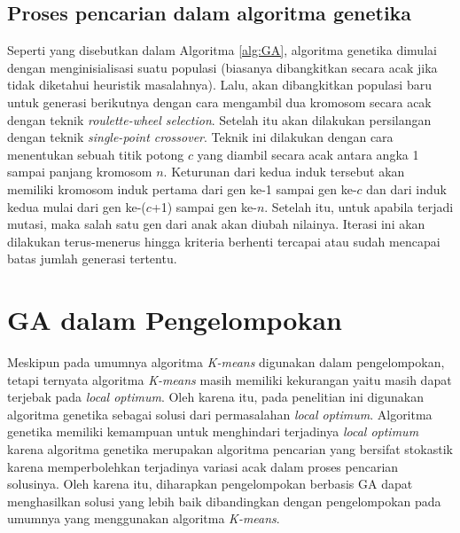 \subsection{Proses pencarian dalam algoritma genetika}
Seperti yang disebutkan dalam Algoritma \ref{alg:GA}, algoritma genetika dimulai dengan menginisialisasi suatu populasi (biasanya dibangkitkan secara acak jika tidak diketahui heuristik masalahnya). Lalu, akan dibangkitkan populasi baru untuk generasi berikutnya dengan cara mengambil dua kromosom secara acak dengan teknik \textit{roulette-wheel selection}. Setelah itu akan dilakukan persilangan dengan teknik \textit{single-point crossover}. Teknik ini dilakukan dengan cara menentukan sebuah titik potong $c$ yang diambil secara acak antara angka 1 sampai panjang kromosom $n$. Keturunan dari kedua induk tersebut akan memiliki kromosom induk pertama dari gen ke-1 sampai gen ke-$c$ dan dari induk kedua mulai dari gen ke-($c$+1) sampai gen ke-$n$. Setelah itu, untuk apabila terjadi mutasi, maka salah satu gen dari anak akan diubah nilainya. Iterasi ini akan dilakukan terus-menerus hingga kriteria berhenti tercapai atau sudah mencapai batas jumlah generasi tertentu.

\section{GA dalam Pengelompokan}
Meskipun pada umumnya algoritma \textit{K-means} digunakan dalam pengelompokan, tetapi ternyata algoritma \textit{K-means} masih memiliki kekurangan yaitu masih dapat terjebak pada \textit{local optimum}. Oleh karena itu, pada penelitian ini digunakan algoritma genetika sebagai solusi dari permasalahan \textit{local optimum}. Algoritma genetika memiliki kemampuan untuk menghindari terjadinya \textit{local optimum} karena algoritma genetika merupakan algoritma pencarian yang bersifat stokastik karena memperbolehkan terjadinya variasi acak dalam proses pencarian solusinya. Oleh karena itu, diharapkan pengelompokan berbasis GA dapat menghasilkan solusi yang lebih baik dibandingkan dengan pengelompokan pada umumnya yang menggunakan algoritma \textit{K-means}.